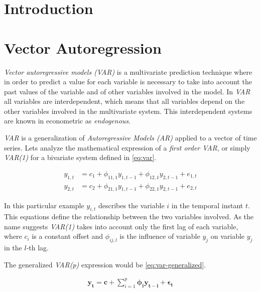 
\chapter{Introduction}
\label{ch:introduction}

\chapter{Vector Autoregression}
\label{ch:vector-autoregression}

\textit{Vector autoregressive models (VAR)} is a multivariate
prediction technique where in order to predict a value for each
variable is necessary to take into account the past values of the
variable and of other variables involved in the model. In \textit{VAR}
all variables are interdependent, which means that all variables
depend on the other variables involved in the multivariate system.
This interdependent systems are known in econometric as
\textit{endogenous}.

\textit{VAR} is a generalization of \textit{Autoregressive Models
  (AR)} applied to a vector of time series. Lets analyze the
mathematical expression of a \textit{first order VAR}, or simply
\textit{VAR(1)} for a bivariate system defined in \autoref{eq:var}.

\begin{equation}
  \begin{aligned}
    \label{eq:var}
    y_{1,t} & = c_1 + \phi_{11,1} y_{1,t-1} + \phi_{12,1} y_{2,t-1} +
    e_{1,t} \\
    y_{2,t} & = c_2 + \phi_{21,1} y_{1,t-1} + \phi_{22,1} y_{2,t-1} +
    e_{2,t} 
  \end{aligned}
\end{equation}

In this particular example $y_{i, t}$ describes the variable $i$ in
the temporal instant $t$. This equations define the relationship
between the two variables involved. As the name suggests
\textit{VAR(1)} takes into account only the first lag of each
variable, where $c_i$ is a constant offset and $\phi_{ij,l}$ is the
influence of variable $y_j$ on variable $y_j$ in the $l$-th lag.

The generalized \textit{VAR(p)} expression would be
\autoref{eq:var-generalized}.

\begin{equation}
  \begin{aligned}
    \label{eq:var-generalized}
    \mathbf{y_t} = \mathbf{c} + \displaystyle\sum_{i=1}^p
    \pmb{\phi_i} \mathbf{y_{t-i}} + \pmb{\epsilon_t}
  \end{aligned}
\end{equation}


